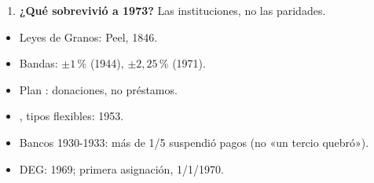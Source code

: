 \documentclass{article}
\begin{document}
\begin{columnas}
\begin{enumerate}
\item \textbf{¿Qué sobrevivió a 1973?} Las instituciones, no las paridades.
\end{enumerate}
\begin{trampa}
\begin{itemize}
\item Leyes de Granos:  Peel, 1846.
\item Bandas: $\pm1$\,\% (1944), $\pm2{,}25$\,\% (1971).
\item Plan : donaciones, no préstamos.
\item {}, tipos flexibles: 1953.
\item Bancos 1930-1933: más de 1/5 suspendió pagos (no «un tercio quebró»).
\item DEG: 1969; primera asignación, 1/1/1970.
\end{itemize}
\end{trampa}

\end{columnas}
\end{document}
